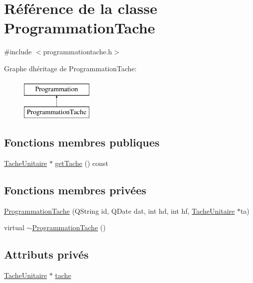 \hypertarget{class_programmation_tache}{}\section{Référence de la classe Programmation\+Tache}
\label{class_programmation_tache}


{\ttfamily \#include $<$programmationtache.\+h$>$}

Graphe d\textquotesingle{}héritage de Programmation\+Tache\+:\begin{figure}[H]
\begin{center}
\leavevmode
\includegraphics[height=2.000000cm]{class_programmation_tache}
\end{center}
\end{figure}
\subsection*{Fonctions membres publiques}
\begin{DoxyCompactItemize}
\item 
\hyperlink{class_tache_unitaire}{Tache\+Unitaire} $\ast$ \hyperlink{class_programmation_tache_a768420cbc2955fbd0fa4d51651e883f0}{get\+Tache} () const 
\end{DoxyCompactItemize}
\subsection*{Fonctions membres privées}
\begin{DoxyCompactItemize}
\item 
\hyperlink{class_programmation_tache_a3e3ed2c9849c76f431ad9ae80e1832a9}{Programmation\+Tache} (Q\+String id, Q\+Date dat, int hd, int hf, \hyperlink{class_tache_unitaire}{Tache\+Unitaire} $\ast$ta)
\item 
virtual \hyperlink{class_programmation_tache_a3dae2689c0f94e4f33dd19a7362e498c}{$\sim$\+Programmation\+Tache} ()
\end{DoxyCompactItemize}
\subsection*{Attributs privés}
\begin{DoxyCompactItemize}
\item 
\hyperlink{class_tache_unitaire}{Tache\+Unitaire} $\ast$ \hyperlink{class_programmation_tache_a107df0f6b1dca79ca0b83739d8d177dc}{tache}
\end{DoxyCompactItemize}
